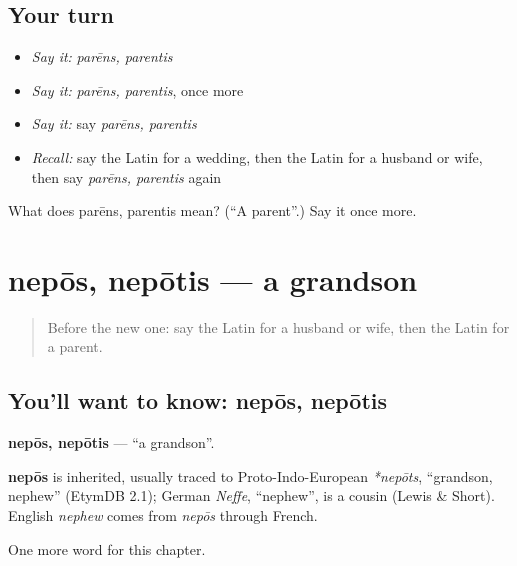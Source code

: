 \subsection*{Your turn}
\begin{itemize}
\raggedright
  \item \emph{Say it:} \emph{parēns, parentis}
  \item \emph{Say it:} \emph{parēns, parentis}, once more
  \item \emph{Say it:} say \emph{parēns, parentis}
  \item \emph{Recall:} say the Latin for a wedding, then the Latin for a husband or wife, then say \emph{parēns, parentis} again
\end{itemize}

\begin{tcolorbox}[breakable,colback=teal!4,colframe=teal!35!black,title={Before you move on}]
What does parēns, parentis mean? (\textquotedblleft{}A parent\textquotedblright{}.) Say it once more.
\end{tcolorbox}
\section[nepōs, nepōtis]{nepōs, nepōtis — a grandson}

\label{lesson:LA-C273-nepos}



\begin{quote}
Before the new one: say the Latin for a husband or wife, then the Latin for a parent.
\end{quote}

\subsection*{You'll want to know: nepōs, nepōtis}
\textbf{nepōs, nepōtis} — \textquotedblleft{}a grandson\textquotedblright{}.

\begin{cousinweb}
\textbf{nepōs} is inherited, usually traced to Proto-Indo-European \emph{*nepōts}, \textquotedblleft{}grandson, nephew\textquotedblright{} (EtymDB 2.1); German \emph{Neffe}, \textquotedblleft{}nephew\textquotedblright{}, is a cousin (Lewis \& Short). English \emph{nephew} comes from \emph{nepōs} through French.
\end{cousinweb}

\begin{grammarlens}[title={What you've built}]
One more word for this chapter.
\end{grammarlens}

